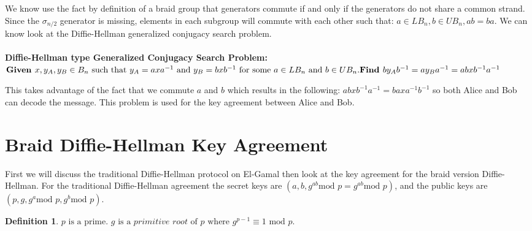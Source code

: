 \documentclass{article}
\theoremstyle{definition}
\newtheorem{definition}{Definition}[section]
\begin{document}
We know use the fact by definition of a braid group that generators commute if and only if the generators do not share a common strand. Since the $\sigma_{n/2}$ generator is missing, elements in each subgroup will commute with each other such that: $a \in LB_n, b \in UB_n, ab=ba$. We can know look at the Diffie-Hellman generalized conjugacy search problem.
\\ \\
\textbf{Diffie-Hellman type Generalized Conjugacy Search Problem:} \\ $\textbf{Given }x,y_A, y_B \in B_n \text{ such that }y_A=axa^{-1} \text{ and } y_B=bxb^{-1} \text{ for some }a \in LB_n \text{ and }b \in UB_n. \\ \textbf{Find }by_Ab^{-1}=ay_Ba^{-1}=abxb^{-1}a^{-1}$

This takes advantage of the fact that we commute $a$ and $b$ which results in the following: $abxb^{-1}a^{-1}=baxa^{-1}b^{-1}$ so both Alice and Bob can decode the message. This problem is used for the key agreement between Alice and Bob.

\section{Braid Diffie-Hellman Key Agreement}
First we will discuss the traditional Diffie-Hellman protocol on El-Gamal then look at the key agreement for the braid version Diffie-Hellman. For the traditional Diffie-Hellman agreement the secret keys are $(a,b,g^{ab} \text{mod }p=g^{ab} \text{mod }p)$, and the public keys are $(p,g,g^a \text{mod }p,g^b \text{mod }p)$. 

\begin{definition}
$p \text{ is a prime. } g \text{ is a }\textit{primitive root } \text{of }p \text{ where }g^{p-1}\equiv 1 \text{ mod }p. $
\end{definition}
\end{document}
